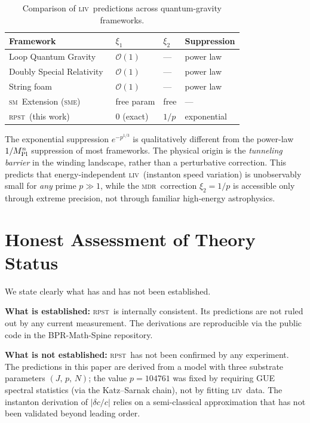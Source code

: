 \documentclass[aps,prd,twocolumn,showpacs,preprintnumbers]{revtex4-2}
\newcommand{\rpst}{\textsc{rpst}}
\newcommand{\Mpl}{M_{\rm Pl}}
\newcommand{\SM}{\textsc{sm}}
\newcommand{\MDR}{\textsc{mdr}}
\newcommand{\LIV}{\textsc{liv}}
\newcommand{\abs}[1]{\left|#1\right|}
\begin{document}
\begin{table}[h]
\caption{Comparison of \LIV\ predictions across quantum-gravity frameworks.}
\label{tab:compare}
\begin{ruledtabular}
\begin{tabular}{llll}
Framework & $\xi_1$ & $\xi_2$ & Suppression\\
\hline
Loop Quantum Gravity~\cite{Gambini1998}    & $\mathcal{O}(1)$     & —         & power law\\
Doubly Special Relativity~\cite{Amelino-Camelia2000} & $\mathcal{O}(1)$ & — & power law\\
String foam~\cite{Ellis1997}              & $\mathcal{O}(1)$     & —         & power law\\
\SM\ Extension (\textsc{sme})~\cite{Colladay1998} & free param & free & —\\
\rpst\ (this work)                        & $0$ (exact)          & $1/p$     & exponential\\
\end{tabular}
\end{ruledtabular}
\end{table}

The exponential suppression $e^{-p^{1/3}}$ is qualitatively different from
the power-law $1/\Mpl^n$ suppression of most frameworks.  The physical origin
is the \textit{tunneling barrier} in the winding landscape, rather than a
perturbative correction.  This predicts that energy-independent \LIV\
(instanton speed variation) is unobservably small for \textit{any} prime $p
\gg 1$, while the \MDR\ correction $\xi_2 = 1/p$ is accessible only through
extreme precision, not through familiar high-energy astrophysics.

\section{Honest Assessment of Theory Status}
\label{sec:status}

We state clearly what has and has not been established.

\textbf{What is established:} \rpst\ is internally consistent.  Its
predictions are not ruled out by any current measurement.  The derivations
are reproducible via the public code in the BPR-Math-Spine repository.

\textbf{What is not established:} \rpst\ has not been confirmed by any
experiment.  The predictions in this paper are derived from a model with three
substrate parameters $(J,\, p,\, N)$; the value $p = 104761$ was fixed by
requiring GUE spectral statistics (via the Katz--Sarnak chain), not by fitting
\LIV\ data.  The instanton derivation of $\abs{\delta c/c}$ relies on a
semi-classical approximation that has not been validated beyond leading order.
\end{document}

